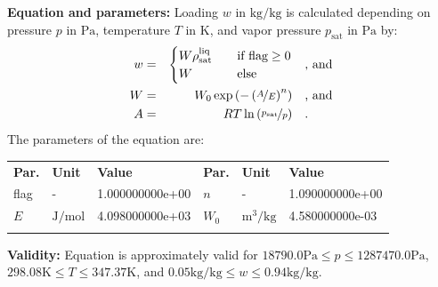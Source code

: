 \textbf{Equation and parameters:}
\newline
%
Loading $w$ in $\si{\kilogram\per\kilogram}$ is calculated depending on pressure $p$ in $\si{\pascal}$, temperature $T$ in $\si{\kelvin}$, and vapor pressure $p_\mathrm{sat}$ in $\si{\pascal}$ by:
%
\begin{equation*}
\begin{split}
w &=& \begin{cases} W \rho_\mathrm{sat}^{\mathrm{liq}} & \quad \text{if flag} \geq 0 \\ W & \quad \text{else} \end{cases} & \quad\text{, and} \\
W &=& W_0 \exp \left( - \left( \nicefrac{A}{E} \right) ^{n} \right) & \quad\text{, and} \\
A &=& R T \ln \left( \nicefrac{p_\mathrm{sat}}{p} \right) & \quad\text{.} \\
\end{split}
\end{equation*}
%
The parameters of the equation are:
%
\begin{longtable}[l]{lll|lll}
\toprule
\addlinespace
\textbf{Par.} & \textbf{Unit} & \textbf{Value} &	\textbf{Par.} & \textbf{Unit} & \textbf{Value} \\
\addlinespace
\midrule
\endhead

\bottomrule
\endfoot
\bottomrule
\endlastfoot
\addlinespace

flag & - & 1.000000000e+00 & $n$ & - & 1.090000000e+00 \\
$E$ & $\si{\joule\per\mole}$ & 4.098000000e+03 & $W_0$ & $\si{\cubic\meter\per\kilogram}$ & 4.580000000e-03 \\

\addlinespace\end{longtable}

\textbf{Validity:}
\newline
Equation is approximately valid for $18790.0 \si{\pascal} \leq p \leq 1287470.0 \si{\pascal}$,  $298.08 \si{\kelvin} \leq T \leq 347.37 \si{\kelvin}$, and $0.05 \si{\kilogram\per\kilogram} \leq w \leq 0.94 \si{\kilogram\per\kilogram}$.
\newline

